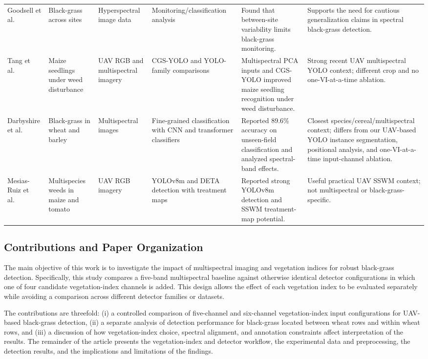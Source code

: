 \documentclass{ieeeaccess}
\begin{document}
\begin{table}[t]
\begin{tabular}{p{} p{} p{} p{} p{} p{}}
        Goodsell et al.~\cite{goodsell_black_grass_2024} & Black-grass across sites & Hyperspectral image data & Monitoring/classification analysis & Found that between-site variability limits black-grass monitoring. & Supports the need for cautious generalization claims in spectral black-grass detection. \\
        Tang et al.~\cite{tang_cgs_yolo_2025} & Maize seedlings under weed disturbance & UAV RGB and multispectral imagery & CGS-YOLO and YOLO-family comparisons & Multispectral PCA inputs and CGS-YOLO improved maize seedling recognition under weed disturbance. & Strong recent UAV multispectral YOLO context; different crop and no one-VI-at-a-time ablation. \\
        Darbyshire et al.~\cite{darbyshire_blackgrass_2025} & Black-grass in wheat and barley & Multispectral images & Fine-grained classification with CNN and transformer classifiers & Reported 89.6\% accuracy on unseen-field classification and analyzed spectral-band effects. & Closest species/cereal/multispectral context; differs from our UAV-based YOLO instance segmentation, positional analysis, and one-VI-at-a-time input-channel ablation. \\
        Mesias-Ruiz et al.~\cite{mesias_ruiz_multispecies_2026} & Multispecies weeds in maize and tomato & UAV RGB imagery & YOLOv8m and DETA detection with treatment maps & Reported strong YOLOv8m detection and SSWM treatment-map potential. & Useful practical UAV SSWM context; not multispectral or black-grass-specific. \\
        \bottomrule
    \end{tabular}
\end{table}

\subsection{Contributions and Paper Organization}
The main objective of this work is to investigate the impact of multispectral imaging and vegetation indices for robust black-grass detection. Specifically, this study compares a five-band multispectral baseline against otherwise identical detector configurations in which one of four candidate vegetation-index channels is added. This design allows the effect of each vegetation index to be evaluated separately while avoiding a comparison across different detector families or datasets.

The contributions are threefold: (i) a controlled comparison of five-channel and six-channel vegetation-index input configurations for UAV-based black-grass detection, (ii) a separate analysis of detection performance for black-grass located between wheat rows and within wheat rows, and (iii) a discussion of how vegetation-index choice, spectral alignment, and annotation constraints affect interpretation of the results. The remainder of the article presents the vegetation-index and detector workflow, the experimental data and preprocessing, the detection results, and the implications and limitations of the findings.
\end{document}
